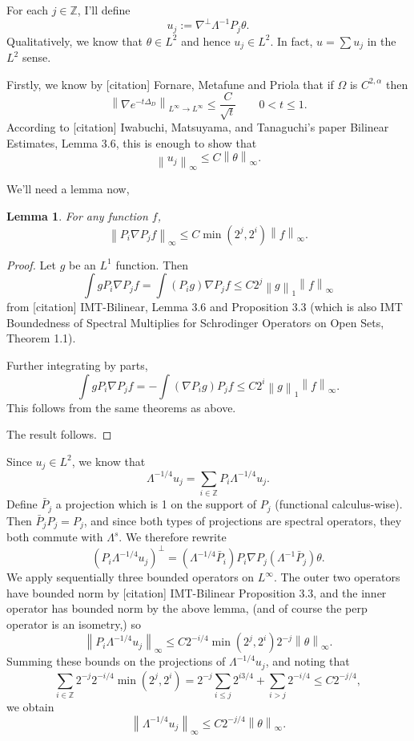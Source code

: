 \documentclass[11pt]{amsart}
\newtheorem{lemma}[theorem]{Lemma}
\theoremstyle{remark}
\theoremstyle{definition}
\newcommand{\Z}{\mathbb{Z}}
\newcommand{\norm}[1]{\left\lVert#1\right\rVert}
\newcommand{\paren}[1]{\left( #1 \right)}
\newcommand{\grad}{\nabla}
\newcommand{\Laplace}{\Delta}
\begin{document}
For each $j \in \Z$, I'll define
\[ u_j := \grad^\perp \Lambda^{-1} P_j \theta. \]
Qualitatively, we know that $\theta \in L^2$ and hence $u_j \in L^2$.  In fact, $u = \sum u_j$ in the $L^2$ sense.  

Firstly, we know by [citation] Fornare, Metafune and Priola that if $\Omega$ is $C^{2,\alpha}$ then
\[ \norm{\grad e^{-t\Laplace_D}}_{L^\infty \to L^\infty} \leq \frac{C}{\sqrt{t}} \qquad 0 < t \leq 1. \]
According to [citation] Iwabuchi, Matsuyama, and Tanaguchi's paper Bilinear Estimates, Lemma 3.6, this is enough to show that
\[ \norm{u_j}_\infty \leq C \norm{\theta}_\infty. \]

We'll need a lemma now,
\begin{lemma} \label{thm:grad an proj}
For any function $f$,
\[ \norm{P_i \grad P_j f}_\infty \leq C \min(2^j,2^i) \norm{f}_\infty. \]
\end{lemma}
\begin{proof}
Let $g$ be an $L^1$ function.  Then
\[ \int g P_i \grad P_j f = \int (P_i g) \grad P_j f \leq C 2^j \norm{g}_1 \norm{f}_\infty \]
from [citation] IMT-Bilinear, Lemma 3.6 and Proposition 3.3 (which is also IMT Boundedness of Spectral Multiplies for Schrodinger Operators on Open Sets, Theorem 1.1).  

Further integrating by parts,
\[ \int g P_i \grad P_j f = - \int (\grad P_i g) P_j f \leq C 2^i \norm{g}_1 \norm{f}_\infty. \]
This follows from the same theorems as above.  

The result follows.  
\end{proof}

Since $u_j \in L^2$, we know that
\[ \Lambda^{-1/4} u_j = \sum_{i \in \Z} P_i \Lambda^{-1/4} u_j. \]
Define $\bar{P}_j$ a projection which is 1 on the support of $P_j$ (functional calculus-wise).  Then $\bar{P}_j P_j = P_j$, and since both types of projections are spectral operators, they both commute with $\Lambda^s$.  We therefore rewrite
\[ \paren{P_i \Lambda^{-1/4} u_j}^\perp = \paren{\Lambda^{-1/4} \bar{P}_i} P_i \grad P_j \paren{\Lambda^{-1} \bar{P}_j} \theta. \]
We apply sequentially three bounded operators on $L^\infty$.  The outer two operators have bounded norm by [citation] IMT-Bilinear Proposition 3.3, and the inner operator has bounded norm by the above lemma, (and of course the perp operator is an isometry,) so 
\[ \norm{ P_i \Lambda^{-1/4} u_j}_\infty \leq C 2^{-i/4} \min(2^j, 2^i) 2^{-j} \norm{\theta}_\infty. \]
%
Summing these bounds on the projections of $\Lambda^{-1/4} u_j$, and noting that
\[ \sum_{i \in \Z} 2^{-j} 2^{-i/4} \min(2^j,2^i) = 2^{-j} \sum_{i \leq j} 2^{i 3/4} + \sum_{i>j} 2^{-i/4} \leq C 2^{-j/4}, \]
we obtain
\[ \norm{\Lambda^{-1/4} u_j}_\infty \leq C 2^{-j/4} \norm{\theta}_\infty. \]
\end{document}
